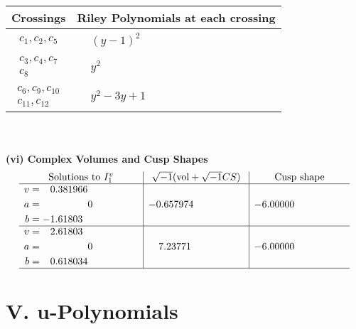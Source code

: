 \documentclass[1p]{elsarticle_modified}
\theoremstyle{definition}
\newcommand{\I}{\sqrt{-1}}
\begin{document}
\begin{tabular}{m{50pt}|m{274pt}}
Crossings & \hspace{64pt}Riley Polynomials at each crossing \\
\hline $$\begin{aligned}c_{1},c_{2},c_{5}\end{aligned}$$&$\begin{aligned}
&(y-1)^2
\end{aligned}$\\
\hline $$\begin{aligned}c_{3},c_{4},c_{7}\\c_{8}\end{aligned}$$&$\begin{aligned}
&y^2
\end{aligned}$\\
\hline $$\begin{aligned}c_{6},c_{9},c_{10}\\c_{11},c_{12}\end{aligned}$$&$\begin{aligned}
&y^2-3 y+1
\end{aligned}$\\
\hline
\end{tabular}\\~\\
\newpage\flushleft \textbf{(vi) Complex Volumes and Cusp Shapes}
$$\begin{array}{c|c|c}  
\text{Solutions to }I^v_{1}& \I (\text{vol} + \sqrt{-1}CS) & \text{Cusp shape}\\
 \hline 
\begin{aligned}
v &= \phantom{-}0.381966\phantom{ +0.000000I} \\
a &= \phantom{-0.000000 } 0 \\
b &= -1.61803\phantom{ +0.000000I}\end{aligned}
 & -0.657974\phantom{ +0.000000I} & -6.00000\phantom{ +0.000000I} \\ \hline\begin{aligned}
v &= \phantom{-}2.61803\phantom{ +0.000000I} \\
a &= \phantom{-0.000000 } 0 \\
b &= \phantom{-}0.618034\phantom{ +0.000000I}\end{aligned}
 & \phantom{-}7.23771\phantom{ +0.000000I} & -6.00000\phantom{ +0.000000I}\\
 \hline 
 \end{array}$$\newpage
\newpage\renewcommand{\arraystretch}{1}
\centering \section*{ V. u-Polynomials}
\end{document}
